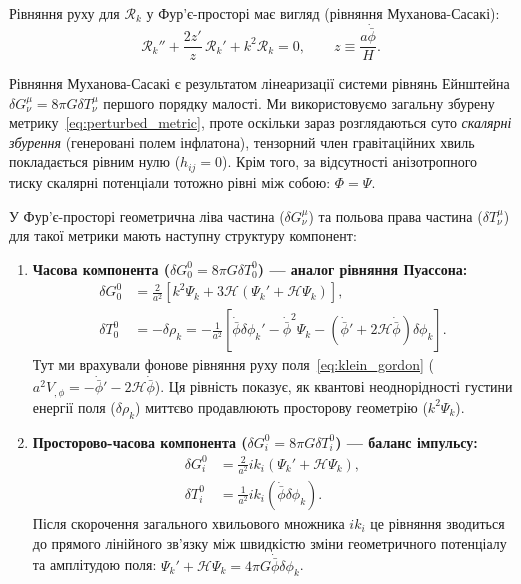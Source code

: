 Рівняння руху для $\mathcal{R}_k$ у Фур'є-просторі має вигляд \cite{bardeen_1980} (рівняння Муханова-Сасакі):
\begin{equation}\label{eq:R_eom}
  \mathcal{R}_k'' + \frac{2z'}{z}\,\mathcal{R}_k' + k^2\mathcal{R}_k = 0, \qquad z \equiv \frac{a\dot{\bar\phi}}{H}.
\end{equation}

\begin{mathbox}

    Рівняння Муханова-Сасакі є результатом лінеаризації системи рівнянь Ейнштейна
    $\delta G^\mu_\nu = 8\pi G \delta T^\mu_\nu$ першого порядку малості. Ми використовуємо загальну
    збурену метрику~\eqref{eq:perturbed_metric}, проте оскільки зараз розглядаються суто
    \emph{скалярні збурення} (генеровані полем інфлатона), тензорний член гравітаційних хвиль
    покладається рівним нулю ($h_{ij} = 0$). Крім того, за відсутності анізотропного тиску
    скалярні потенціали тотожно рівні між собою: $\Phi = \Psi$.

    У Фур'є-просторі геометрична ліва частина ($\delta G^\mu_\nu$) та польова права частина ($\delta T^\mu_\nu$)
    для такої метрики мають наступну структуру компонент:

    \begin{enumerate}
      \item \textbf{Часова компонента ($\delta G^0_0 = 8\pi G \delta T^0_0$) --- аналог рівняння Пуассона:}
      \begin{align*}
        \delta G^0_0 &= \frac{2}{a^2} \left[ k^2\Psi_k + 3\mathcal{H}(\Psi_k' + \mathcal{H}\Psi_k) \right], \\
        \delta T^0_0 &= -\delta\rho_k = - \frac{1}{a^2} \left[ \dot{\bar{\phi}}\delta\phi_k' - \dot{\bar{\phi}}^2\Psi_k - (\dot{\bar{\phi}}' + 2\mathcal{H}\dot{\bar{\phi}})\delta\phi_k \right].
      \end{align*}
      Тут ми врахували фонове рівняння руху поля~\eqref{eq:klein_gordon} ($a^2 V_{,\phi} = -\dot{\bar{\phi}}' - 2\mathcal{H}\dot{\bar{\phi}}$). Ця рівність показує, як квантові неоднорідності густини енергії поля ($\delta\rho_k$) миттєво продавлюють просторову геометрію ($k^2\Psi_k$).

      \item \textbf{Просторово-часова компонента ($\delta G^0_i = 8\pi G \delta T^0_i$) --- баланс імпульсу:}
      \begin{align*}
        \delta G^0_i &= \frac{2}{a^2} i k_i (\Psi_k' + \mathcal{H}\Psi_k), \\
        \delta T^0_i &= \frac{1}{a^2} i k_i \left( \dot{\bar{\phi}} \delta\phi_k \right).
      \end{align*}
      Після скорочення загального хвильового множника $ik_i$ це рівняння зводиться до прямого лінійного зв'язку між швидкістю зміни геометричного потенціалу та амплітудою поля: $\Psi_k' + \mathcal{H}\Psi_k = 4\pi G \dot{\bar{\phi}} \delta\phi_k$.
    \end{enumerate}


\end{mathbox}
